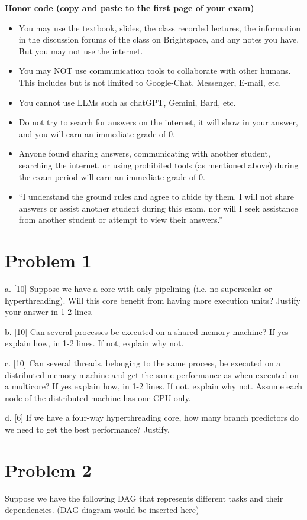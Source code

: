 \documentclass{article}
\begin{document}
\textbf{Honor code (copy and paste to the first page of your exam)}
\begin{itemize}
    \item You may use the textbook, slides, the class recorded lectures, the information in the discussion forums of the class on Brightspace, and any notes you have. But you may not use the internet.
    \item You may NOT use communication tools to collaborate with other humans. This includes but is not limited to Google-Chat, Messenger, E-mail, etc.
    \item You cannot use LLMs such as chatGPT, Gemini, Bard, etc.
    \item Do not try to search for answers on the internet, it will show in your answer, and you will earn an immediate grade of 0.
    \item Anyone found sharing answers, communicating with another student, searching the internet, or using prohibited tools (as mentioned above) during the exam period will earn an immediate grade of 0.
    \item ``I understand the ground rules and agree to abide by them. I will not share answers or assist another student during this exam, nor will I seek assistance from another student or attempt to view their answers.''
\end{itemize}

\section*{Problem 1}
a. [10] Suppose we have a core with only pipelining (i.e. no superscalar or hyperthreading). Will this core benefit from having more execution units? Justify your answer in 1-2 lines.

b. [10] Can several processes be executed on a shared memory machine? If yes explain how, in 1-2 lines. If not, explain why not.

c. [10] Can several threads, belonging to the same process, be executed on a distributed memory machine and get the same performance as when executed on a multicore? If yes explain how, in 1-2 lines. If not, explain why not. Assume each node of the distributed machine has one CPU only.

d. [6] If we have a four-way hyperthreading core, how many branch predictors do we need to get the best performance? Justify.


\section*{Problem 2}
Suppose we have the following DAG that represents different tasks and their dependencies.  (DAG diagram would be inserted here)
\end{document}
